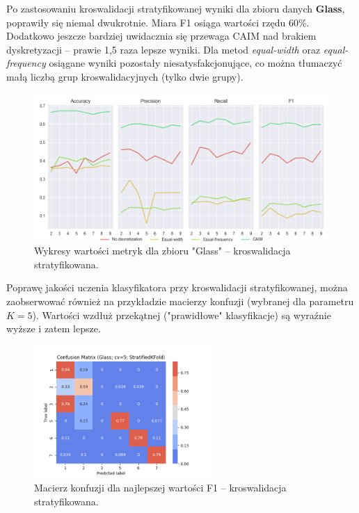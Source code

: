 \pagebreak
Po zastosowaniu kroswalidacji stratyfikowanej wyniki dla zbioru danych \textbf{Glass},
poprawiły się niemal dwukrotnie. Miara F1 osiąga wartości rzędu 60\%. Dodatkowo jeszcze
bardziej uwidacznia się przewaga CAIM nad brakiem dyskretyzacji -- prawie 1,5 raza lepsze
wyniki. Dla metod \textit{equal-width} oraz \textit{equal-frequency} osiągane wyniki
pozostały niesatysfakcjonujące, co można tłumaczyć małą liczbą grup kroswalidacyjnych
(tylko dwie grupy).

\begin{figure}[H]
\center
    \includegraphics[width=\textwidth]{img/cv_scores_stratifiedkfold/scoring_stratifiedkfold_glass.png}
    \caption{Wykresy wartości metryk dla zbioru "Glass" -- kroswalidacja stratyfikowana.}
\end{figure}

Poprawę jakości uczenia klasyfikatora przy kroswalidacji stratyfikowanej, można zaobserwować również
na przykładzie macierzy konfuzji (wybranej dla parametru $K = 5$). Wartości wzdłuż przekątnej ("prawidłowe"
klasyfikacje) są wyraźnie wyższe i zatem lepsze.

\begin{figure}[H]
\center
    \includegraphics[width=0.6\textwidth]{img/conf_matrices/cm_Glass_cv5_StratifiedKFold.png}
    \caption{Macierz konfuzji dla najlepszej wartości F1 -- kroswalidacja stratyfikowana.}
\end{figure}


